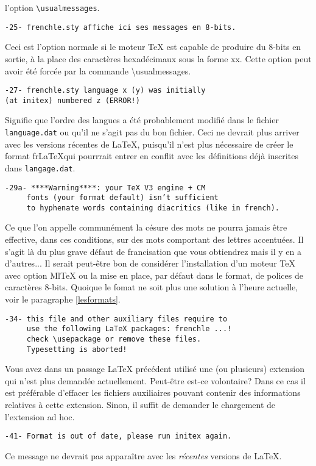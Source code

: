 \documentclass[a4paper,12pt,openright]{article}
\begin{document}
l’option \verb|\usualmessages|.\\
\begin{verbatim}
-25- frenchle.sty affiche ici ses messages en 8-bits.
\end{verbatim}
Ceci est l’option normale si le moteur \TeX{} est capable de produire du 8-bits
 en sortie, à la place des caractères hexadécimaux sous la forme \chap\chap{}xx. 
Cette option peut avoir été forcée par la commande \backslash{}usualmessages.\\
\begin{verbatim}
-27- frenchle.sty language x (y) was initially
(at initex) numbered z (ERROR!)
\end{verbatim}
Signifie que l’ordre des langues a été probablement modifié dans le fichier
\texttt{language.dat} ou qu’il ne s’agit pas du bon fichier.
Ceci ne devrait plus arriver avec les versions récentes de \LaTeX,
puisqu'il n'est plus nécessaire de créer le format fr\LaTeX qui pourrrait entrer en conflit
avec les définitions déjà inscrites dans \texttt{langage.dat}.\\
\begin{verbatim}
-29a- ****Warning****: your TeX V3 engine + CM
     fonts (your format default) isn’t sufficient
     to hyphenate words containing diacritics (like in french).
\end{verbatim}
Ce que l’on appelle communément la césure des mots ne pourra jamais
être effective, dans ces conditions, sur des mots comportant des lettres
accentuées. Il s’agit là du plus grave défaut de francisation que vous obtiendrez
mais il y en a d’autres... Il serait peut-être bon de considérer
l’installation d’un moteur \TeX{} avec option Ml\TeX{} ou la mise en place,
par défaut dans le format, de polices de caractères 8-bits.
Quoique le fomat ne soit plus une solution à l'heure actuelle, voir le paragraphe \ref{lesformats}.\\
\begin{verbatim}
-34- this file and other auxiliary files require to
     use the following LaTeX packages: frenchle ...!
     check \usepackage or remove these files.
     Typesetting is aborted! 
\end{verbatim}
Vous avez dans un passage \LaTeX{} précédent utilisé une (ou plusieurs)
extension qui n’est plus demandée actuellement. Peut-être est-ce volontaire?
Dans ce cas il est préférable d’effacer les fichiers auxiliaires pouvant
contenir des informations relatives à cette extension. Sinon, il suffit de demander
le chargement de l’extension ad hoc.\\
\begin{verbatim}
-41- Format is out of date, please run initex again.
\end{verbatim}
Ce message ne devrait pas apparaître avec les {\em récentes} versions de \LaTeX.
\end{document}
